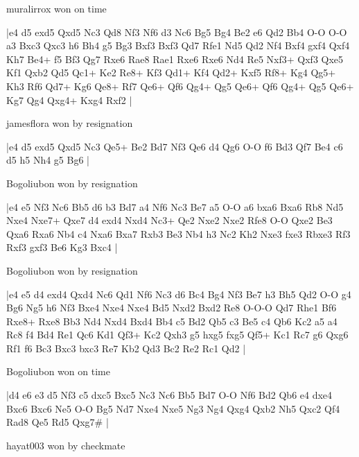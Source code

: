 \showboard

muralirrox won on time

\makegametitle
|e4 d5 exd5 Qxd5 Nc3 Qd8 Nf3 Nf6 d3 Nc6 Bg5 Bg4 Be2 e6 Qd2 Bb4 O-O O-O a3 Bxc3 Qxc3 h6 Bh4 g5 Bg3 Bxf3 Bxf3 Qd7 Rfe1 Nd5 Qd2 Nf4 Bxf4 gxf4 Qxf4 Kh7 Be4+ f5 Bf3 Qg7 Rxe6 Rae8 Rae1 Rxe6 Rxe6 Nd4 Re5 Nxf3+ Qxf3 Qxe5 Kf1 Qxb2 Qd5 Qc1+ Ke2 Re8+ Kf3 Qd1+ Kf4 Qd2+ Kxf5 Rf8+ Kg4 Qg5+ Kh3 Rf6 Qd7+ Kg6 Qe8+ Rf7 Qe6+ Qf6 Qg4+ Qg5 Qe6+ Qf6 Qg4+ Qg5 Qe6+ Kg7 Qg4 Qxg4+ Kxg4 Rxf2  |

\showboard

jamesflora won by resignation

\makegametitle
|e4 d5 exd5 Qxd5 Nc3 Qe5+ Be2 Bd7 Nf3 Qe6 d4 Qg6 O-O f6 Bd3 Qf7 Be4 c6 d5 h5 Nh4 g5 Bg6  |

\showboard

Bogoliubon won by resignation

\makegametitle
|e4 e5 Nf3 Nc6 Bb5 d6 b3 Bd7 a4 Nf6 Nc3 Be7 a5 O-O a6 bxa6 Bxa6 Rb8 Nd5 Nxe4 Nxe7+ Qxe7 d4 exd4 Nxd4 Nc3+ Qe2 Nxe2 Nxe2 Rfe8 O-O Qxe2 Be3 Qxa6 Rxa6 Nb4 c4 Nxa6 Bxa7 Rxb3 Be3 Nb4 h3 Nc2 Kh2 Nxe3 fxe3 Rbxe3 Rf3 Rxf3 gxf3 Be6 Kg3 Bxc4  |

\showboard

Bogoliubon won by resignation

\makegametitle
|e4 e5 d4 exd4 Qxd4 Nc6 Qd1 Nf6 Nc3 d6 Bc4 Bg4 Nf3 Be7 h3 Bh5 Qd2 O-O g4 Bg6 Ng5 h6 Nf3 Bxe4 Nxe4 Nxe4 Bd5 Nxd2 Bxd2 Re8 O-O-O Qd7 Rhe1 Bf6 Rxe8+ Rxe8 Bb3 Nd4 Nxd4 Bxd4 Bb4 c5 Bd2 Qb5 c3 Be5 c4 Qb6 Kc2 a5 a4 Rc8 f4 Bd4 Re1 Qc6 Kd1 Qf3+ Kc2 Qxh3 g5 hxg5 fxg5 Qf5+ Kc1 Rc7 g6 Qxg6 Rf1 f6 Bc3 Bxc3 bxc3 Re7 Kb2 Qd3 Bc2 Re2 Rc1 Qd2  |

\showboard

Bogoliubon won on time

\makegametitle
|d4 e6 e3 d5 Nf3 c5 dxc5 Bxc5 Nc3 Nc6 Bb5 Bd7 O-O Nf6 Bd2 Qb6 e4 dxe4 Bxc6 Bxc6 Ne5 O-O Bg5 Nd7 Nxe4 Nxe5 Ng3 Ng4 Qxg4 Qxb2 Nh5 Qxc2 Qf4 Rad8 Qe5 Rd5 Qxg7\#  |

\showboard

hayat003 won by checkmate

